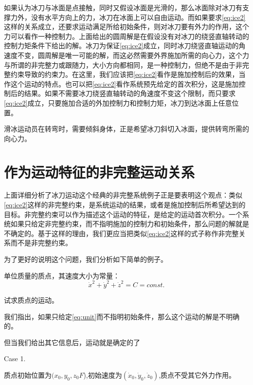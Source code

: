 \documentclass{ctexart}
\begin{document}
如果认为冰刀与冰面是点接触，同时又假设冰面是光滑的，那么冰面除对冰刀有支撑力外，没有水平方向上的力，冰刀在冰面上可以自由运动。而如果要求\eqref{eq:ice2}这样的关系成立，还要求运动满足所给初始条件，则对冰刀要有外力的作用，这个力可以看作一种控制力。上面给出的圆周解是在假设没有对冰刀的绕竖直轴转动的控制力矩条件下给出的解。冰刀为保证\eqref{eq:ice2}成立，同时冰刀绕竖直轴运动的角速度不变，圆周解是唯一可能的解，而这必然需要外界施加所需的向心力，这个力与所谓的非完整力或跟随力，大小方向都相同，是一种控制力，但绝不是由于非完整约束导致的约束力。在这里，我们应该把\eqref{eq:ice2}看作是施加控制后的效果，当作这个运动的特点。也可以把\eqref{eq:ice2}看作系统预先给定的首次积分，这是施加控制后的结果。如果不需要冰刀绕竖直轴转动的角速度不变这个限制，而只要求\eqref{eq:ice2}成立，只要施加合适的外加控制力和控制力矩，冰刀到达冰面上任意位置。

滑冰运动员在转弯时，需要倾斜身体，正是希望冰刀斜切入冰面，提供转弯所需的向心力。

\section{作为运动特征的非完整运动关系}

上面详细分析了冰刀运动这个经典的非完整系统例子正是要表明这个观点：类似\eqref{eq:ice2}这样的非完整约束，是系统运动的结果，或者是施加控制后所希望达到的目标。非完整约束可以作为描述这个运动的特征，是给定的运动首次积分。一个系统如果只给定非完整约束，而不指明施加的控制力和初始条件，那么问题的解就是不确定的。基于这样的理由，我们更应当把类似\eqref{eq:ice2}这样的式子称作非完整关系而不是非完整约束。

为了更好的说明这个问题，我们分析如下简单的例子。

\begin{example}
单位质量的质点，其速度大小为常量：
\begin{equation}
  \label{eq:unit}
  \dot{x}^2+\dot{y}^2+\dot{z}^2 = C = const.
\end{equation}

试求质点的运动。


\end{example}

我们指出，如果只给定\eqref{eq:unit}而不指明初始条件，那么这个运动的解是不明确的。

但当我们给出其它信息后，运动就是确定的了

Case 1.

质点初始位置为$(x_0,y_0,z_0F$),初始速度为$(\dot{x}_0,\dot{y}_0,\dot{z}_0)$,质点不受其它外力作用。
\end{document}
